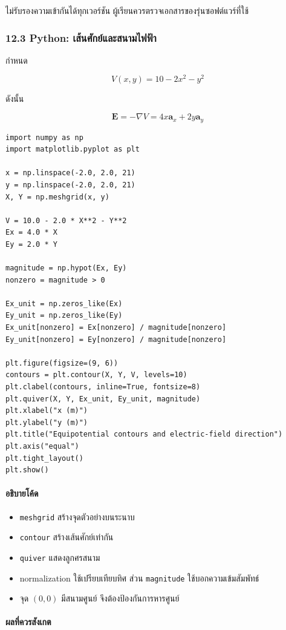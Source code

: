 ไม่รับรองความเข้ากันได้ทุกเวอร์ชัน ผู้เรียนควรตรวจเอกสารของรุ่นซอฟต์แวร์ที่ใช้

\subsubsection{12.3 Python: เส้นศักย์และสนามไฟฟ้า}

กำหนด

\[
V(x,y)=10-2x^2-y^2
\]

ดังนั้น

\[
\mathbf{E}=-\nabla V=4x\mathbf{a}_x+2y\mathbf{a}_y
\]

\begin{verbatim}
import numpy as np
import matplotlib.pyplot as plt

x = np.linspace(-2.0, 2.0, 21)
y = np.linspace(-2.0, 2.0, 21)
X, Y = np.meshgrid(x, y)

V = 10.0 - 2.0 * X**2 - Y**2
Ex = 4.0 * X
Ey = 2.0 * Y

magnitude = np.hypot(Ex, Ey)
nonzero = magnitude > 0

Ex_unit = np.zeros_like(Ex)
Ey_unit = np.zeros_like(Ey)
Ex_unit[nonzero] = Ex[nonzero] / magnitude[nonzero]
Ey_unit[nonzero] = Ey[nonzero] / magnitude[nonzero]

plt.figure(figsize=(9, 6))
contours = plt.contour(X, Y, V, levels=10)
plt.clabel(contours, inline=True, fontsize=8)
plt.quiver(X, Y, Ex_unit, Ey_unit, magnitude)
plt.xlabel("x (m)")
plt.ylabel("y (m)")
plt.title("Equipotential contours and electric-field direction")
plt.axis("equal")
plt.tight_layout()
plt.show()
\end{verbatim}

\paragraph{อธิบายโค้ด}

\begin{itemize}
\item \texttt{meshgrid} สร้างจุดตัวอย่างบนระนาบ
\item \texttt{contour} สร้างเส้นศักย์เท่ากัน
\item \texttt{quiver} แสดงลูกศรสนาม
\item normalization ใช้เปรียบเทียบทิศ ส่วน \texttt{magnitude} ใช้บอกความเข้มสัมพัทธ์
\item จุด \((0,0)\) มีสนามศูนย์ จึงต้องป้องกันการหารศูนย์
\end{itemize}

\paragraph{ผลที่ควรสังเกต}

